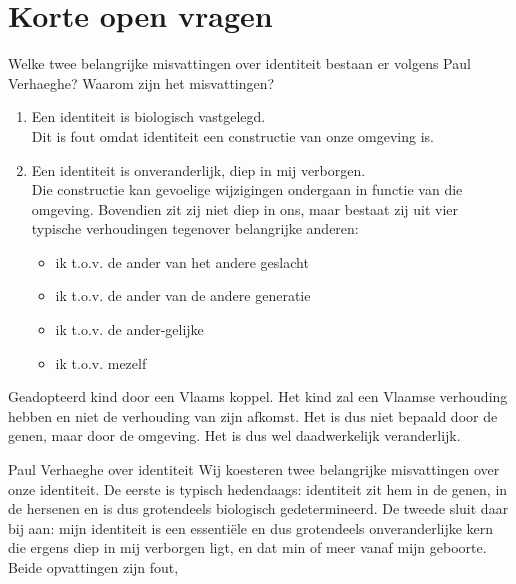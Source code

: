 \documentclass[main.tex]{subfiles}
\begin{document}
\section{Korte open vragen}

\begin{examenvraag}
    \begin{vraag}
        Welke twee belangrijke misvattingen over identiteit bestaan er volgens Paul Verhaeghe? Waarom zijn het misvattingen?
    \end{vraag}

    \begin{antwoord}
        \begin{enumerate}
            \item Een identiteit is biologisch vastgelegd.\\
            Dit is fout omdat identiteit een constructie van onze omgeving is. 
            \item Een identiteit is onveranderlijk, diep in mij verborgen.\\
            Die constructie kan gevoelige wijzigingen ondergaan in functie van die omgeving.  Bovendien zit zij niet diep in ons, maar bestaat zij uit vier
			typische verhoudingen tegenover belangrijke anderen:
			\begin{itemize}
				\item ik t.o.v. de ander van het andere geslacht
				\item ik t.o.v. de ander van de andere generatie
				\item ik t.o.v. de ander-gelijke
				\item ik t.o.v. mezelf
			\end{itemize}
        \end{enumerate}
        Geadopteerd kind door een Vlaams koppel. Het kind zal een Vlaamse verhouding
        hebben en niet de verhouding van zijn afkomst. Het is dus niet bepaald door de genen, maar door de
        omgeving. Het is dus wel daadwerkelijk veranderlijk.
        \begin{citaat}{Paul Verhaeghe over identiteit}
            Wij koesteren twee belangrijke misvattingen over onze identiteit.
            De eerste is typisch hedendaags: identiteit zit hem in de genen, in de hersenen en is dus grotendeels biologisch gedetermineerd.
            De tweede sluit daar bij aan: mijn identiteit is een essentiële en dus grotendeels onveranderlijke kern die ergens diep in mij verborgen ligt, en dat min of meer vanaf mijn geboorte.
            Beide opvattingen zijn fout,
        \end{citaat}
    \end{antwoord}
\end{examenvraag}
\end{document}
